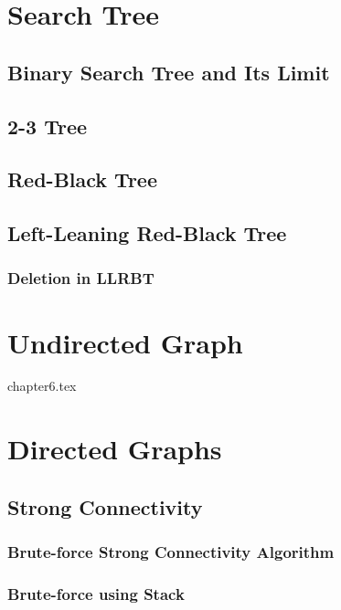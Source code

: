 \documentclass{report}
\begin{document}

\chapter{Search Tree}

\section{Binary Search Tree and Its Limit}

\section{2-3 Tree}

\section{Red-Black Tree}

\section{Left-Leaning Red-Black Tree}

\subsection{Deletion in LLRBT}


\chapter{Undirected Graph}

{chapter6.tex}


\chapter{Directed Graphs}

\section{Strong Connectivity}

\subsection{Brute-force Strong Connectivity Algorithm}

\subsection{Brute-force using Stack}
\end{document}
